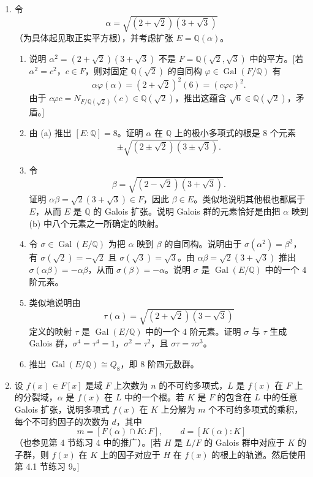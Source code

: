\begin{enumerate}[label=\arabic*.]
\item 令
\[
\alpha=\sqrt{(2+\sqrt2)(3+\sqrt3)}
\]
（为具体起见取正实平方根），并考虑扩张 $E=\mathbb Q(\alpha)$。
\begin{enumerate}[label=(\alph*)]
\item 说明 $\alpha^2=(2+\sqrt2)(3+\sqrt3)$ 不是 $F=\mathbb Q(\sqrt2,\sqrt3)$ 中的平方。[若 $\alpha^2=c^2$，$c\in F$，则对固定 $\mathbb Q(\sqrt2)$ 的自同构 $\varphi\in\operatorname{Gal}(F/\mathbb Q)$ 有
\[
\alpha\varphi(\alpha)=(2+\sqrt2)^2(6)=(c\varphi c)^2.
\]
由于 $c\varphi c=N_{F/\mathbb Q(\sqrt2)}(c)\in\mathbb Q(\sqrt2)$，推出这蕴含 $\sqrt6\in\mathbb Q(\sqrt2)$，矛盾。]
\item 由 (a) 推出 $[E:\mathbb Q]=8$。证明 $\alpha$ 在 $\mathbb Q$ 上的极小多项式的根是 $8$ 个元素
\[
\pm\sqrt{(2\pm\sqrt2)(3\pm\sqrt3)}.
\]
\item 令
\[
\beta=\sqrt{(2-\sqrt2)(3+\sqrt3)}.
\]
证明 $\alpha\beta=\sqrt2(3+\sqrt3)\in F$，因此 $\beta\in E$。类似地说明其他根也都属于 $E$，从而 $E$ 是 $\mathbb Q$ 的 Galois 扩张。说明 Galois 群的元素恰好是由把 $\alpha$ 映到 (b) 中八个元素之一所确定的映射。
\item 令 $\sigma\in\operatorname{Gal}(E/\mathbb Q)$ 为把 $\alpha$ 映到 $\beta$ 的自同构。说明由于 $\sigma(\alpha^2)=\beta^2$，有 $\sigma(\sqrt2)=-\sqrt2$ 且 $\sigma(\sqrt3)=\sqrt3$。由 $\alpha\beta=\sqrt2(3+\sqrt3)$ 推出 $\sigma(\alpha\beta)=-\alpha\beta$，从而 $\sigma(\beta)=-\alpha$。说明 $\sigma$ 是 $\operatorname{Gal}(E/\mathbb Q)$ 中的一个 $4$ 阶元素。
\item 类似地说明由
\[
\tau(\alpha)=\sqrt{(2+\sqrt2)(3-\sqrt3)}
\]
定义的映射 $\tau$ 是 $\operatorname{Gal}(E/\mathbb Q)$ 中的一个 $4$ 阶元素。证明 $\sigma$ 与 $\tau$ 生成 Galois 群，$\sigma^4=\tau^4=1$，$\sigma^2=\tau^2$，且 $\sigma\tau=\tau\sigma^3$。
\item 推出 $\operatorname{Gal}(E/\mathbb Q)\cong Q_8$，即 $8$ 阶四元数群。
\end{enumerate}

\item 设 $f(x)\in F[x]$ 是域 $F$ 上次数为 $n$ 的不可约多项式，$L$ 是 $f(x)$ 在 $F$ 上的分裂域，$\alpha$ 是 $f(x)$ 在 $L$ 中的一个根。若 $K$ 是 $F$ 的包含在 $L$ 中的任意 Galois 扩张，说明多项式 $f(x)$ 在 $K$ 上分解为 $m$ 个不可约多项式的乘积，每个不可约因子的次数为 $d$，其中
\[
m=[F(\alpha)\cap K:F],
\qquad
 d=[K(\alpha):K]
\]
（也参见第 4 节练习 4 中的推广）。[若 $H$ 是 $L/F$ 的 Galois 群中对应于 $K$ 的子群，则 $f(x)$ 在 $K$ 上的因子对应于 $H$ 在 $f(x)$ 的根上的轨道。然后使用第 4.1 节练习 9。]


\end{enumerate}
